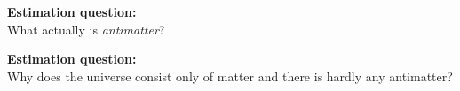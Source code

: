 \begin{frame} \Large
    \begin{center}
     \textcolor{LHCbDarkBlue}{\textbf{Estimation question:} }\\ \vspace{1cm}
     What actually is \emph{antimatter}?
    \end{center} \pause
    \begin{center}  \vspace{1cm}
    \end{center}
\end{frame}



\begin{frame} \Large
    \begin{center}
     \textcolor{LHCbDarkBlue}{\textbf{Estimation question:} }\\ \vspace{1cm}
     Why does the universe consist only of matter and there is hardly any antimatter?
    \end{center}
    \begin{center}  \vspace{1cm}\pause
    \end{center}
\end{frame}








